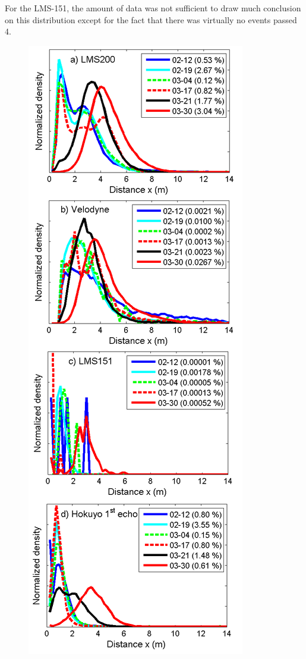 For the LMS-151, the amount of data was not sufficient to draw much conclusion on this distribution except for the fact that there was virtually no events passed 4.


\begin{figure}[th]
    \centering
    \includegraphics[width=0.80\linewidth]{./img/Histograms.png}

\end{figure}
